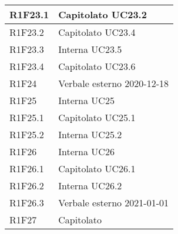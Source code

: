 \begin{center}
\begin{longtable}{|p{22mm}|p{22mm}|}
R1F23.1 &
Capitolato \newline
UC23.2 \newline
\\
\hline

R1F23.2 &
Capitolato \newline
UC23.4 \newline
\\
\hline

R1F23.3 &
Interna \newline
UC23.5 \newline
\\
\hline

R1F23.4 &
Capitolato \newline
UC23.6 \newline
\\
\hline

R1F24 &
Verbale esterno 2020-12-18 \newline
\\
\hline

R1F25 &
Interna \newline
UC25 \newline
\\
\hline

R1F25.1 &
Capitolato \newline
UC25.1 \newline
\\
\hline

R1F25.2 &
Interna \newline
UC25.2 \newline
\\
\hline

R1F26 &
Interna \newline
UC26 \newline
\\
\hline

R1F26.1 &
Capitolato \newline
UC26.1 \newline
\\
\hline

R1F26.2 &
Interna \newline
UC26.2 \newline
\\
\hline

R1F26.3 &
Verbale esterno 2021-01-01 \newline
\\
\hline

R1F27 &
Capitolato \newline
\\
\hline


\end{longtable}
\end{center}
